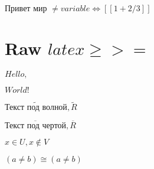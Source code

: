 
\(\text{Привет }\allowbreak\text{мир }\allowbreak\neq variable \Leftrightarrow [[1 + 2 / 3]]\)

\section{Raw $latex \ge >=$}


\(Hello, \)\( World!\)

\(\widetilde {\text{Текст }\allowbreak\text{под }\allowbreak\text{волной}\allowbreak}, \widetilde R\)

\(\overline {\text{Текст }\allowbreak\text{под }\allowbreak\text{чертой}\allowbreak}, \overline R\)

\(x \in U, x \not\in V\)

\((a \neq b) \cong (a \neq b)\)
